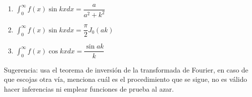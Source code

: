 \begin{enumerate}
\begin{enumerate}[label=\roman*)]
\item $\displaystyle \int_{0}^{\infty} f(x) \sin kx dx = \dfrac{a}{a^{2} +k^{2}}$
\item $\displaystyle \int_{0}^{\infty} f(x) \sin kx dx = \dfrac{\pi}{2} J_{0} (ak)$
\item $\displaystyle \int_{0}^{\infty} f(x) \cos kx dx = \dfrac{\sin ak}{k}$
\end{enumerate}
Sugerencia: usa el teorema de inversión de la transformada de Fourier, en caso de que escojas otra vía, menciona cuál es el procedimiento que se sigue, no es válido hacer inferencias ni emplear funciones de prueba al azar.
\end{enumerate}
